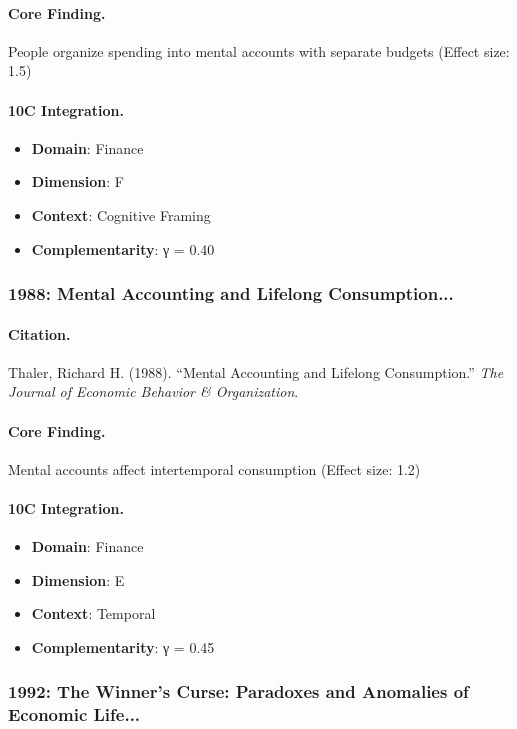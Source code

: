 \paragraph{Core Finding.}
People organize spending into mental accounts with separate budgets (Effect size: 1.5)

\paragraph{10C Integration.}
\begin{itemize}[nosep]
  \item \textbf{Domain}: Finance
  \item \textbf{Dimension}: F
  \item \textbf{Context}: Cognitive Framing
  \item \textbf{Complementarity}: γ = 0.40
\end{itemize}

\subsubsection{1988: Mental Accounting and Lifelong Consumption...}

\paragraph{Citation.}
Thaler, Richard H. (1988). ``Mental Accounting and Lifelong Consumption.''
\textit{The Journal of Economic Behavior & Organization}.

\paragraph{Core Finding.}
Mental accounts affect intertemporal consumption (Effect size: 1.2)

\paragraph{10C Integration.}
\begin{itemize}[nosep]
  \item \textbf{Domain}: Finance
  \item \textbf{Dimension}: E
  \item \textbf{Context}: Temporal
  \item \textbf{Complementarity}: γ = 0.45
\end{itemize}

\subsubsection{1992: The Winner's Curse: Paradoxes and Anomalies of Economic Life...}

